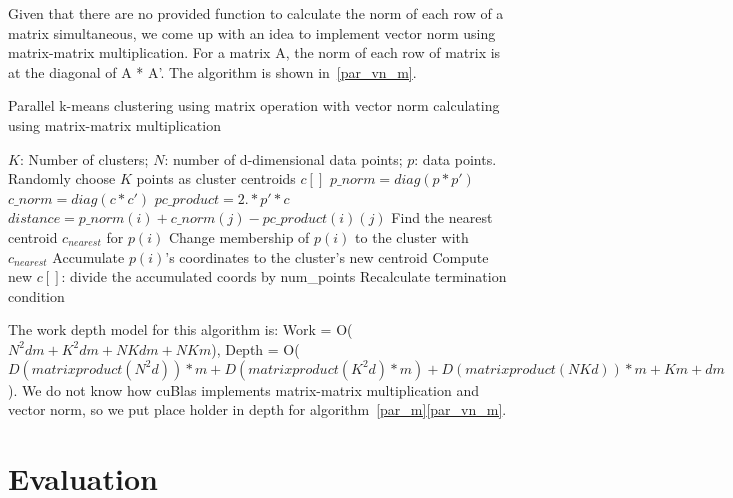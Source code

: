 \documentclass{article}
\begin{document}
Given that there are no provided function to calculate the
norm of each row of a matrix simultaneous, we come up with an idea to implement vector norm using matrix-matrix multiplication. For a matrix A, the norm of each row of matrix is at the diagonal of A * A'. The
algorithm is shown in~\ref{par_vn_m}. 
\begin{algorithm}[!htp]
  \caption{Parallel k-means clustering using matrix operation with vector norm calculating using
    matrix-matrix multiplication} \label{par_vn_m}
  \begin{algorithmic}[1]
    \INPUT $K$: Number of clusters; $N$: number of d-dimensional data points; $p$: data points.
     \label{alg:pm2}
    \State Randomly choose $K$ points as cluster centroids $c[]$
    \State $p\_norm = diag(p * p')$
    \State $c\_norm = diag(c * c')$
    \State $pc\_product = 2 .* p' * c$
    \State $distance = p\_norm(i) + c\_norm(j) - pc\_product(i)(j)$
    \EndFor
    \State Find the nearest centroid $c_{nearest}$ for $p(i)$
    \State Change membership of $p(i)$ to the cluster with $c_{nearest}$
    \State Accumulate $p(i)$'s coordinates to the cluster's new centroid
    \EndParFor
    \State Compute new $c[]$: divide the accumulated coords by num\_points
    \State Recalculate termination condition
    \EndWhile
    \EndFunction
  \end{algorithmic}
\end{algorithm}
The work depth model for this algorithm is: Work = O($N^2dm + K^2dm + NKdm + NKm$),
Depth = O($D(matrix product(N^2d))*m + D(matrix product(K^2d)*m) + D(matrix product(NKd))*m+ Km + dm$).
We do not know how cuBlas implements matrix-matrix multiplication and vector norm, so we put place holder
in depth for algorithm~\ref{par_m}\ref{par_vn_m}. 

\section{Evaluation}
\end{document}
